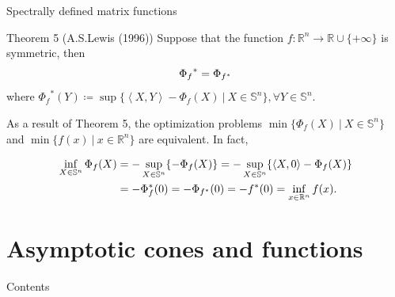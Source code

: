 \documentclass[aspectratio=169, dvipdfmx, 11pt]{beamer} %
\newcommand{\RealNumberSet}{\mathbb{R}}
\newcommand{\NDemenstionalRealEuclideanSpace}{\mathbb{R}^n}
\newcommand{\NDemenstionalRealSymmetricMatrixSpace}{\mathbb{S}^n}
\newcommand{\InnerProduct}[2]{\left\langle {#1},{#2}\right\rangle} %
\newcommand{\ExtendedRealValuedFunction}[2]{{#1}: {#2} \to \RealNumberSet \cup \{+\infty\}}
\newcommand{\ConjugateFunction}[1]{{#1}^*}
\begin{document}
\begin{frame}{Spectrally defined matrix functions}
  \begin{block}{Theorem 5 (A.S.Lewis (1996))}
    Suppose that the function $\ExtendedRealValuedFunction{f}{\NDemenstionalRealEuclideanSpace}$ is symmetric, then
    \begin{equation}
      {\Phi_{f}}^* = \Phi_{f^*} \notag
    \end{equation}
    where ${\Phi_{f}}^* (Y) \coloneqq \sup \{\InnerProduct{X}{Y} - \Phi_{f} (X) \:|\: X \in \NDemenstionalRealSymmetricMatrixSpace\}, \forall Y \in \NDemenstionalRealSymmetricMatrixSpace$.
  \end{block}

  As a result of Theorem 5, the optimization problems $\min \{\Phi_{f}(X) \:|\: X \in \NDemenstionalRealSymmetricMatrixSpace\}$ and $\min \{f(x) \:|\: x \in \NDemenstionalRealEuclideanSpace\}$ are equivalent. In fact,

  \begin{align}
    \inf_{X \in \NDemenstionalRealSymmetricMatrixSpace} \Phi_{f}(X) &= - \sup_{X \in \NDemenstionalRealSymmetricMatrixSpace} \{- \Phi_{f}(X)\} = - \sup_{X \in \NDemenstionalRealSymmetricMatrixSpace} \{\InnerProduct{X}{0} - \Phi_{f}(X)\} \notag \\
    &= - \Phi^*_{f}(0) = - \Phi_{\ConjugateFunction{f}}(0) = - \ConjugateFunction{f}(0) = \inf_{x \in \NDemenstionalRealEuclideanSpace} f(x). \notag
  \end{align}
\end{frame}

\section{Asymptotic cones and functions}
\begin{frame}{Contents}
  \tableofcontents[currentsection]
\end{frame}
\end{document}
